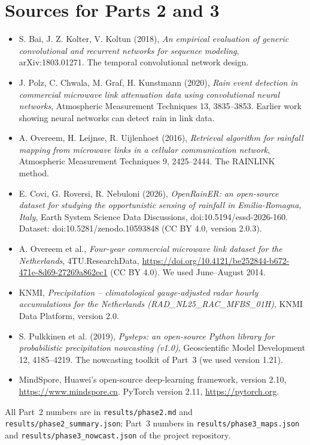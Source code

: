\section{Sources for Parts 2 and 3}
\small
\begin{itemize}
\item S. Bai, J. Z. Kolter, V. Koltun (2018), \emph{An empirical evaluation of generic convolutional and recurrent networks for sequence modeling}, arXiv:1803.01271. The temporal convolutional network design.
\item J. Polz, C. Chwala, M. Graf, H. Kunstmann (2020), \emph{Rain event detection in commercial microwave link attenuation data using convolutional neural networks}, Atmospheric Measurement Techniques 13, 3835--3853. Earlier work showing neural networks can detect rain in link data.
\item A. Overeem, H. Leijnse, R. Uijlenhoet (2016), \emph{Retrieval algorithm for rainfall mapping from microwave links in a cellular communication network}, Atmospheric Measurement Techniques 9, 2425--2444. The RAINLINK method.
\item E. Covi, G. Roversi, R. Nebuloni (2026), \emph{OpenRainER: an open-source dataset for studying the opportunistic sensing of rainfall in Emilia-Romagna, Italy}, Earth System Science Data Discussions, doi:10.5194/essd-2026-160. Dataset: doi:10.5281/zenodo.10593848 (CC BY 4.0, version 2.0.3).
\item A. Overeem et al., \emph{Four-year commercial microwave link dataset for the Netherlands}, 4TU.ResearchData, \url{https://doi.org/10.4121/be252844-b672-471e-8d69-27269a862ec1} (CC BY 4.0). We used June--August 2014.
\item KNMI, \emph{Precipitation -- climatological gauge-adjusted radar hourly accumulations for the Netherlands (RAD\_NL25\_RAC\_MFBS\_01H)}, KNMI Data Platform, version 2.0.
\item S. Pulkkinen et al. (2019), \emph{Pysteps: an open-source Python library for probabilistic precipitation nowcasting (v1.0)}, Geoscientific Model Development 12, 4185--4219. The nowcasting toolkit of Part~3 (we used version 1.21).
\item MindSpore, Huawei's open-source deep-learning framework, version 2.10, \url{https://www.mindspore.cn}. PyTorch version 2.11, \url{https://pytorch.org}.
\end{itemize}
All Part~2 numbers are in \texttt{results/phase2.md} and \texttt{results/phase2\_summary.json}; Part~3 numbers in \texttt{results/phase3\_maps.json} and \texttt{results/phase3\_nowcast.json} of the project repository.
\normalsize

